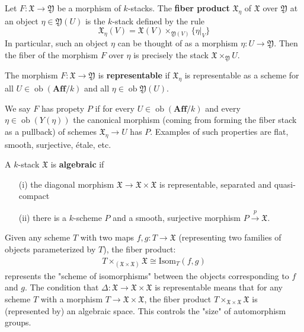 \documentclass[12pt]{article}
\DeclareMathOperator{\ob}{ob}
\begin{document}
\begin{definition}
    Let $F: \mathfrak{X} \to \mathfrak{Y}$ be a morphism of $k$-stacks. The \textbf{fiber product} $\mathfrak{X}_\eta$ of $\mathfrak{X}$ over $\mathfrak{Y}$ at an object $\eta \in \mathfrak{Y}(U)$ is the $k$-stack defined by the rule
    \[
        \mathfrak{X}_\eta(V) = \mathfrak{X}(V) \times_{\mathfrak{Y}(V)} \{\eta|_V\}
    \]
    In particular, such an object $\eta$ can be thought of as a morphism $\eta: U \to \mathfrak{Y}$. Then the fiber of the morphism $F$ over $\eta$ is precisely the stack $\mathfrak{X} \times_{\mathfrak{Y}} U$.

    The morphism $F: \mathfrak{X} \to \mathfrak{Y}$ is \textbf{representable} if $\mathfrak{X}_\eta$ is representable as a scheme for all $U \in \ob(\mathbf{Aff}/k)$ and all $\eta \in \ob\mathfrak{Y}(U)$.



    We say $F$ has propety $P$ if for every $U \in \ob(\mathbf{Aff}/k)$ and every $\eta \in \ob(Y(\eta))$ the canonical morphism (coming from forming the fiber stack as a pullback) of schemes $\mathfrak{X}_\eta \to U$ has $P$.  Examples of such properties are flat, smooth, surjective, étale, etc.
\end{definition}

\begin{definition}
    A $k$-stack $\mathfrak{X}$ is \textbf{algebraic} if
    \begin{enumerate}
        \item[(i)] the diagonal morphism $\mathfrak{X} \to \mathfrak{X} \times \mathfrak{X}$ is representable, separated and quasi-compact
        \item[(ii)] there is a $k$-scheme $P$ and a smooth, surjective morphism $P \stackrel{p}{\to} \mathfrak{X}$.
    \end{enumerate}
\end{definition}

\begin{remark}
    Given any scheme $T$ with two maps $f, g : T \to \mathfrak{X}$ (representing two families of objects parameterized by $T$), the fiber product:
    \begin{align*}
        T \times_{(\mathfrak{X} \times \mathfrak{X})} \mathfrak{X} \cong \text{Isom}_T(f, g)
    \end{align*}
    represents the "scheme of isomorphisms" between the objects corresponding to $f$ and $g$.    The condition that $\Delta : \mathfrak{X} \to \mathfrak{X} \times \mathfrak{X}$ is representable means that for any scheme $T$ with a morphism $T \to \mathfrak{X} \times \mathfrak{X}$, the fiber product $T \times_{\mathfrak{X} \times \mathfrak{X}} \mathfrak{X}$ is (represented by) an algebraic space. This controls the "size" of automorphism groups.
\end{remark}
\end{document}
